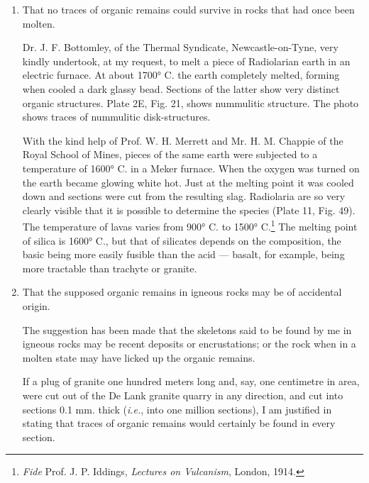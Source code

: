 \documentclass[a4paper, 12pt, oneside, landscape]{article}
\begin{document}
\begin{enumerate}
  \item That no traces of organic remains could survive in rocks that had once been molten.

\hspace*{5mm}Dr. J. F. Bottomley, of the Thermal Syndicate, Newcastle-on-Tyne, very kindly undertook, at my request, to melt a piece of Radiolarian earth in an electric furnace. At about 1700° C. the earth completely melted, forming when cooled a dark glassy bead. Sections of the latter show very distinct organic structures. Plate 2E, Fig. 21, shows nummulitic structure. The photo shows traces of nummulitic disk-structures.

\hspace*{5mm}With the kind help of Prof. W. H. Merrett and Mr. H. M. Chappie of the Royal School of Mines, pieces of the same earth were subjected to a temperature of 1600° C. in a Meker furnace. When the oxygen was turned on the earth became glowing white hot. Just at the melting point it was cooled down and sections were cut from the resulting slag. Radiolaria are so very clearly visible that it is possible to determine the species (Plate 11, Fig. 49). The temperature of lavas varies from 900° C. to 1500° C.\footnote{\emph{Fide} Prof. J. P. Iddings, \emph{Lectures on Vulcanism}, London, 1914.} The melting point of silica is 1600° C., but that of silicates depends on the composition, the basic being more easily fusible than the acid --- basalt, for example, being more tractable than trachyte or granite.

  \item That the supposed organic remains in igneous rocks may be of accidental origin.

\hspace*{5mm}The suggestion has been made that the skeletons said to be found by me in igneous rocks may be recent deposits or encrustations; or the rock when in a molten state may have licked up the organic remains.

\hspace*{5mm}If a plug of granite one hundred meters long and, say, one centimetre in area, were cut out of the De Lank granite quarry in any direction, and cut into sections 0.1 mm. thick (\emph{i.e.}, into one million sections), I am justified in stating that traces of organic remains would certainly be found in every section.


\end{enumerate}
\end{document}
